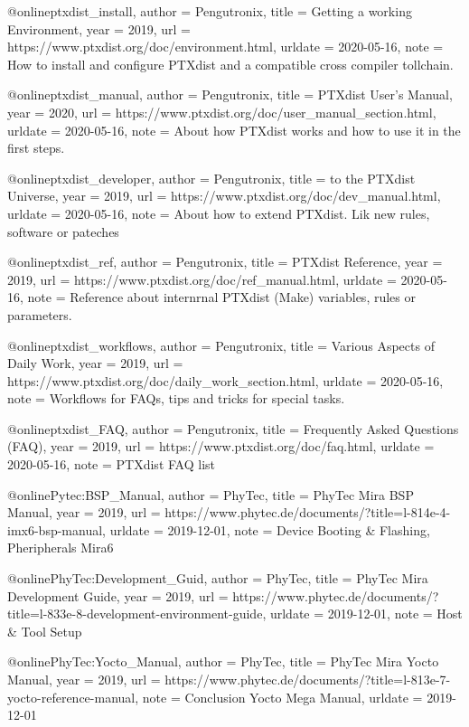 @online{ptxdist_install,
    author = {Pengutronix},
    title = {Getting a working Environment},
    year = 2019,
    url = {https://www.ptxdist.org/doc/environment.html},
    urldate = {2020-05-16},
    note = {How to install and configure PTXdist and a compatible cross compiler
    tollchain.}
}

@online{ptxdist_manual,
    author = {Pengutronix},
    title = {PTXdist User's Manual},
    year = 2020,
    url = {https://www.ptxdist.org/doc/user_manual_section.html},
    urldate = {2020-05-16},
    note = {About how PTXdist works and how to use it in the first steps.}
}

@online{ptxdist_developer,
    author = {Pengutronix},
    title = {to the PTXdist Universe},
    year = 2019,
    url = {https://www.ptxdist.org/doc/dev_manual.html},
    urldate = {2020-05-16},
    note = {About how to extend PTXdist. Lik new rules, software or pateches }
}

@online{ptxdist_ref,
    author = {Pengutronix},
    title = {PTXdist Reference},
    year = 2019,
    url = {https://www.ptxdist.org/doc/ref_manual.html},
    urldate = {2020-05-16},
    note = {Reference about internrnal PTXdist (Make) variables, rules or
        parameters.}
}

@online{ptxdist_workflows,
    author = {Pengutronix},
    title = {Various Aspects of Daily Work},
    year = 2019,
    url = {https://www.ptxdist.org/doc/daily_work_section.html},
    urldate = {2020-05-16},
    note = {Workflows for FAQs, tips and tricks for special tasks.}
}

@online{ptxdist_FAQ,
    author = {Pengutronix},
    title = {Frequently Asked Questions (FAQ)},
    year = 2019,
    url = {https://www.ptxdist.org/doc/faq.html},
    urldate = {2020-05-16},
    note = {PTXdist FAQ list}
}

@online{Pytec:BSP_Manual,
author = {PhyTec},
title = {{PhyTec Mira} BSP Manual},
year = 2019,
url = {https://www.phytec.de/documents/?title=l-814e-4-imx6-bsp-manual},
urldate = {2019-12-01},
note = {Device Booting \& Flashing, Pheripherals Mira6}
}

@online{PhyTec:Development_Guid,
author = {PhyTec},
title = {{PhyTec Mira} Development Guide},
year = 2019,
url = {https://www.phytec.de/documents/?title=l-833e-8-development-environment-guide},
urldate = {2019-12-01},
note = {Host \& Tool Setup}
}


@online{PhyTec:Yocto_Manual,
author = {PhyTec},
title = {{PhyTec Mira} Yocto Manual},
year = 2019,
url = {https://www.phytec.de/documents/?title=l-813e-7-yocto-reference-manual},
note = {Conclusion Yocto Mega Manual},
urldate = {2019-12-01}
}



